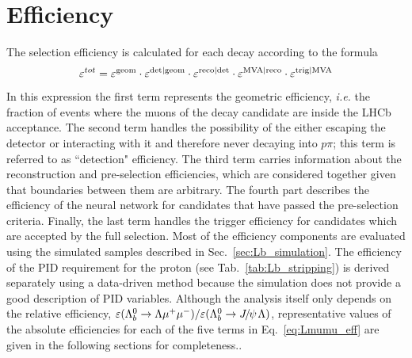 \section{Efficiency}
\label{sec:Lb_eff}

The selection efficiency is calculated for each decay according to the formula
\begin{equation}
\label{eq:Lmumu_eff}
\varepsilon^{tot} = \varepsilon^{\rm geom} \cdot \varepsilon^{\rm det|geom} \cdot \varepsilon^{\rm reco|det} \cdot \varepsilon^{\rm MVA|reco} \cdot \varepsilon^{\rm trig|MVA}
\end{equation}
In this expression the first term represents the geometric efficiency, \emph{i.e.} the fraction of events where
the muons of the decay candidate are inside the LHCb acceptance.
The second term handles the possibility of the \Lz either escaping the detector or interacting with it and therefore
never decaying into $p\pi$; this term is referred to as ``detection" efficiency.
The third term carries information about the reconstruction and pre-selection efficiencies,
which are considered together given that boundaries between them are arbitrary.
The fourth part describes the efficiency of the neural network for candidates that have passed the pre-selection criteria. 
Finally, the last term handles the trigger efficiency for candidates which are accepted by the full selection.
Most of the efficiency components are evaluated using the simulated samples described in Sec.~\ref{sec:Lb_simulation}.
The efficiency of the PID requirement for the proton (see Tab.~\ref{tab:Lb_stripping}) is derived separately 
using a data-driven method because the simulation does not provide a good description of PID variables. 
Although the analysis itself only depends on the relative efficiency,
$\varepsilon(\Lb\to\Lz\mumu)/\varepsilon(\Lb\to\jpsi\Lz)$, representative values of the absolute efficiencies 
for each of the five terms in Eq.~\ref{eq:Lmumu_eff} are given in the following sections for completeness.. 



